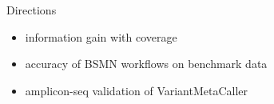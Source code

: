 \documentclass{beamer}
\begin{document}
\begin{frame}{Directions}
\begin{itemize}
\item information gain with coverage 
\item accuracy of BSMN workflows on benchmark data
\item amplicon-seq validation of VariantMetaCaller 
\end{itemize}
\end{frame}
\end{document}
